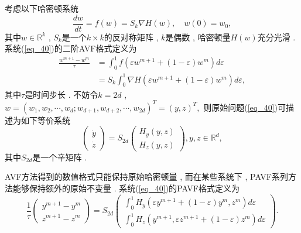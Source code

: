 
考虑以下哈密顿系统
\begin{equation}
\frac{d w}{d t}=f(w)=S_{k} \nabla H(w) , \quad w(0)=w_{0} , 
\label{eq_40}\end{equation}
其中$w \in \mathbb{R}^{k}$ , $S_{k}$是一个$k \times k$的反对称矩阵 , $k$是偶数 , 哈密顿量$H(w)$充分光滑 . 
系统(\ref{eq_40})的二阶AVF格式定义为
\begin{equation}
\begin{aligned}
\frac{w^{m+1}-w^{m}}{\tau} &=\int_{0}^{1} f\left(\varepsilon w^{m+1}+(1-\varepsilon) w^{m}\right) d \varepsilon \\
&=S_{k} \int_{0}^{1} \nabla H\left(\varepsilon w^{m+1}+(1-\varepsilon) w^{m}\right) d \varepsilon , 
\end{aligned}
\label{eq_41}\end{equation}
其中$\tau$是时间步长 . 
不妨令$k=2d$ , $w=\left(w_{1} , w_{2} , \cdots , w_{d} ; w_{d+1} , w_{d+2} , \cdots , w_{2d}\right)^{T}=(y , z)^{T},$  则原始问题(\ref{eq_40})可描述为如下等价系统
\begin{equation}
\left(\begin{array}{l}
\dot{y} \\
\dot{z}
\end{array}\right)=S_{2 d}\left(\begin{array}{c}
H_{y}(y , z) \\
H_{z}(y , z)
\end{array}\right) , y , z \in \mathbb{R}^{d} , 
\label{eq_42}\end{equation}
其中$S_{2 d}$是一个辛矩阵 . 

AVF方法得到的数值格式只能保持原始哈密顿量 , 而在某些系统下 , PAVF系列方法能够保持额外的原始不变量 . 
系统(\ref{eq_40})的PAVF格式定义为
\begin{equation}
\frac{1}{\tau}\left(\begin{array}{c}
y^{m+1}-y^{m} \\
z^{m+1}-z^{m}
\end{array}\right)=S_{2 d}\left(\begin{array}{c}
\int_{0}^{1} H_{y}\left(\varepsilon y^{m+1}+(1-\varepsilon) y^{m} , z^{m}\right) d \varepsilon \\
\int_{0}^{1} H_{z}\left(y^{m+1} , \varepsilon z^{m+1}+(1-\varepsilon) z^{m}\right) d \varepsilon
\end{array}\right)  . 
\label{eq_43}\end{equation}

